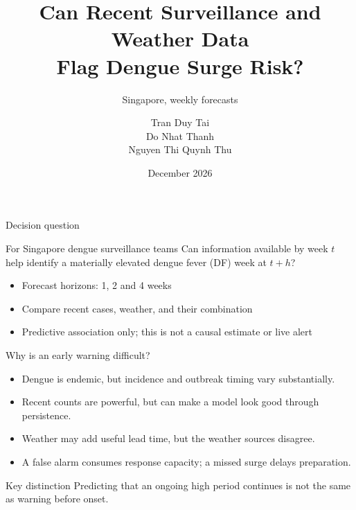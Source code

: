 \documentclass[aspectratio=169,11pt]{beamer}
\title[Dengue Surge Warning]{Can Recent Surveillance and Weather Data\\Flag Dengue Surge Risk?}
\subtitle{Singapore, weekly forecasts}
\author{Tran Duy Tai\\Do Nhat Thanh\\Nguyen Thi Quynh Thu}
\institute{42.510\\Statistical Learning}
\date{December 2026}
\begin{document}
\begin{frame}
  \titlepage
\end{frame}

\begin{frame}{Decision question}
  \begin{block}{For Singapore dengue surveillance teams}
    Can information available by week $t$ help identify a materially elevated
    dengue fever (DF) week at $t+h$?
  \end{block}
  \begin{itemize}
    \item Forecast horizons: 1, 2 and 4 weeks
    \item Compare recent cases, weather, and their combination
    \item Predictive association only; this is not a causal estimate or live alert
  \end{itemize}
\end{frame}

\begin{frame}{Why is an early warning difficult?}
  \begin{itemize}
    \item Dengue is endemic, but incidence and outbreak timing vary substantially.
    \item Recent counts are powerful, but can make a model look good through persistence.
    \item Weather may add useful lead time, but the weather sources disagree.
    \item A false alarm consumes response capacity; a missed surge delays preparation.
  \end{itemize}
  \vspace{0.4em}
  \begin{alertblock}{Key distinction}
    Predicting that an ongoing high period continues is not the same as warning before onset.
  \end{alertblock}
\end{frame}
\end{document}
